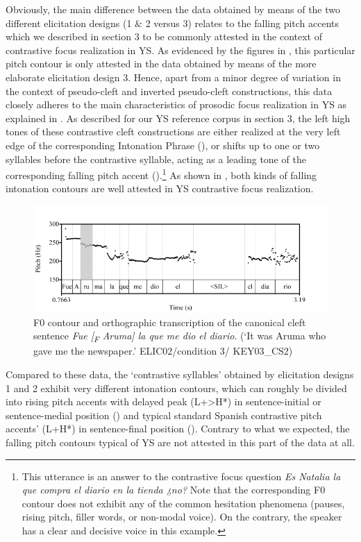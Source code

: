 \documentclass[output=paper]{langsci/langscibook}
\begin{document}
Obviously, the main difference between the data obtained by means of the two different elicitation designs (1 \& 2 versus 3) relates to the falling pitch accents which we described in section 3 to be commonly attested in the context of contrastive focus realization in YS. As evidenced by the figures in , this particular pitch contour is only attested in the data obtained by means of the more elaborate elicitation design 3. Hence, apart from a minor degree of variation in the context of pseudo-cleft and inverted pseudo-cleft constructions, this data closely adheres to the main characteristics of prosodic focus realization in YS as explained in . As described for our YS reference corpus in section 3, the left high tones of these contrastive cleft constructions are either realized at the very left edge of the corresponding Intonation Phrase (), or shifts up to one or two syllables before the contrastive syllable, acting as a leading tone of the corresponding falling pitch accent ().\footnote{This utterance is an answer to the contrastive focus question \textit{Es Natalia la que compra el diario en la tienda ¿no?} Note that the corresponding F0 contour does not exhibit any of the common hesitation phenomena (pauses, rising pitch, filler words, or non-modal voice). On the contrary, the speaker has a clear and decisive voice in this example.} As shown in , both kinds of falling intonation contours are well attested in YS contrastive focus realization.


\begin{figure}
\caption{F0 contour and orthographic transcription of the canonical cleft sentence 
\textit{Fue [\textsubscript{F} Aruma] la que me dio el diario}. 
(‘It was Aruma who gave me the newspaper.’ ELIC02/condition 3/ KEY03\_CS2)}
\label{fig:uth:12}
\includegraphics[width=\textwidth]{figures/UTH-img35.png}
\end{figure}

Compared to these data, the ‘contrastive syllables’ obtained by elicitation designs 1 and 2 exhibit very different intonation contours, which can roughly be divided into rising pitch accents with delayed peak (L+>H*) in sentence-initial or sentence-medial position () and typical standard Spanish contrastive pitch accents' (L+H*) in sentence-final position (). Contrary to what we expected, the falling pitch contours typical of YS are not attested in this part of the data at all.
\end{document}
